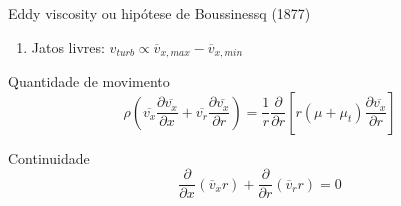\documentclass[10pt]{beamer}
\newcommand{\ddx}[2]{\dfrac{\partial #1}{\partial x_{#2}}}
\newcommand{\ddxp}[2]{\dfrac{\partial }{\partial x_{#2}}\left(#1\right)}
\newcommand{\m}[1]{\overline{#1}}
\begin{document}
\begin{frame}{Eddy viscosity ou hipótese de Boussinessq (1877)}
	
	\begin{enumerate}[$\bullet$]
		\item Jatos livres: $v_{turb} \propto \overline{v}_{x,max} - \overline{v}_{x,min}$
	\end{enumerate}
	
	\begin{block}{Quantidade de movimento}
		\begin{equation*}
		\rho\left( \m{v_x} \ddx{\m{v_x}}{ } + \m{v_r}\dfrac{\partial \m{v_x}}{\partial r} \right) 
		= \dfrac{1}{r} \dfrac{\partial}{\partial r}\left[ r (\mu + \mu_t) \dfrac{\partial\m{v_x}}{\partial r} \right]
		\end{equation*}
	\end{block}
	
	\begin{block}{Continuidade}
	\begin{equation*}
	\ddxp{\m{v}_x r}{ } + \dfrac{\partial}{\partial r}\left( \m{v}_r r \right) = 0
	\end{equation*}
\end{block}

\end{frame}
\end{document}
